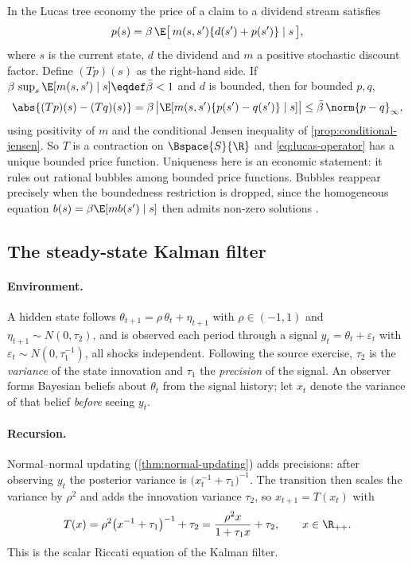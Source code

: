 In the Lucas tree economy the price of a claim to a dividend stream satisfies
\begin{equation}\label{eq:lucas-operator}
	p(s)=\beta\,\E\bigl[\,m(s,s')\{d(s')+p(s')\}\mid s\,\bigr],
\end{equation}
where $s$ is the current state, $d$ the dividend and $m$ a positive stochastic
discount factor. Define $(Tp)(s)$ as the right-hand side. If
$\beta\,\sup_s\E[m(s,s')\mid s]\eqdef\bar\beta<1$ and $d$ is bounded, then for
bounded $p,q$,
\[
	\abs{(Tp)(s)-(Tq)(s)}
	=\beta\,\bigl|\E[m(s,s')\{p(s')-q(s')\}\mid s]\bigr|
	\leq\bar\beta\,\norm{p-q}_\infty,
\]
using positivity of $m$ and the conditional Jensen inequality of
\autoref{prop:conditional-jensen}. So $T$ is a contraction on
$\Bspace{S}{\R}$ and \eqref{eq:lucas-operator} has a unique bounded price
function. Uniqueness here is an economic statement: it rules out rational
bubbles among bounded price functions. Bubbles reappear precisely when the
boundedness restriction is dropped, since the homogeneous equation
$b(s)=\beta\E[m b(s')\mid s]$ then admits non-zero solutions
\autocite{lucas1978asset}.

\subsection{The steady-state Kalman filter}\label{subsec:comp-kalman}

\paragraph{Environment.} A hidden state follows
$\theta_{t+1}=\rho\,\theta_t+\eta_{t+1}$ with $\rho\in(-1,1)$ and
$\eta_{t+1}\sim N(0,\tau_2)$, and is observed each period through a signal
$y_t=\theta_t+\varepsilon_t$ with $\varepsilon_t\sim N(0,\tau_1^{-1})$, all
shocks independent. Following the source exercise, $\tau_2$ is the
\emph{variance} of the state innovation and $\tau_1$ the \emph{precision} of the
signal. An observer forms Bayesian beliefs about $\theta_t$ from the signal
history; let $x_t$ denote the variance of that belief \emph{before} seeing
$y_t$.

\paragraph{Recursion.} Normal--normal updating (\autoref{thm:normal-updating})
adds precisions: after observing $y_t$ the posterior variance is
$\bigl(x_t^{-1}+\tau_1\bigr)^{-1}$. The transition then scales the variance by
$\rho^2$ and adds the innovation variance $\tau_2$, so $x_{t+1}=T(x_t)$ with
\begin{equation}\label{eq:riccati}
	T(x)=\rho^2\bigl(x^{-1}+\tau_1\bigr)^{-1}+\tau_2
	=\frac{\rho^2x}{1+\tau_1x}+\tau_2,
	\qquad x\in\R_{++} .
\end{equation}
This is the scalar Riccati equation of the Kalman filter.


